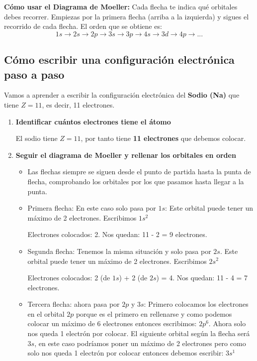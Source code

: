 \begin{remark}
    \textbf{Cómo usar el Diagrama de Moeller:} Cada flecha te indica qué orbitales debes recorrer. Empiezas por la primera flecha (arriba a la izquierda) y sigues el recorrido de cada flecha. El orden que se obtiene es:
    \[
        1s \rightarrow 2s \rightarrow 2p \rightarrow 3s \rightarrow 3p \rightarrow 4s \rightarrow 3d \rightarrow 4p \rightarrow ...
    \]
\end{remark}
\subsection{Cómo escribir una configuración electrónica paso a paso}
Vamos a aprender a escribir la configuración electrónica del \textbf{Sodio (Na)} que tiene \( Z = 11 \), es decir, 11 electrones.
\begin{enumerate}[label=\textbf{Paso \arabic*:}]
        \item \textbf{Identificar cuántos electrones tiene el átomo}

        El sodio tiene \( Z = 11 \), por tanto tiene \textbf{11 electrones} que debemos colocar.

        \item \textbf{Seguir el diagrama de Moeller y rellenar los orbitales en orden}

        \begin{itemize}
            \item Las flechas siempre se siguen desde el punto de partida hasta la punta de flecha, comprobando los orbitales por los que pasamos hasta llegar a la punta.

            \item Primera flecha: En este caso solo pasa por \( 1s \): Este orbital puede tener un máximo de 2 electrones. Escribimos \( 1s^2 \)

            Electrones colocados: 2. Nos quedan: 11 - 2 = 9 electrones.

            \item Segunda flecha: Tenemos la misma situación y solo pasa por \( 2s \). Este orbital puede tener un máximo de 2 electrones. Escribimos \( 2s^2 \)

            Electrones colocados: 2 (de \( 1s \)) + 2 (de \( 2s \)) = 4. Nos quedan: 11 - 4 = 7 electrones.

            \item Tercera flecha: ahora pasa por \( 2p \) y \( 3s \): Primero colocamos los electrones en el orbital \( 2p \) porque es el primero en rellenarse y como podemos colocar un máximo de \num{6} electrones entonces escribimos: \( 2p^6 \). Ahora solo nos queda 1 electrón por colocar. El siguiente orbital según la flecha será \( 3s \), en este caso podríamos poner un máximo de \num{2} electrones pero como solo nos queda \num{1} electrón por colocar entonces debemos escribir: \( 3s^1 \)


\end{itemize}
\end{enumerate}
